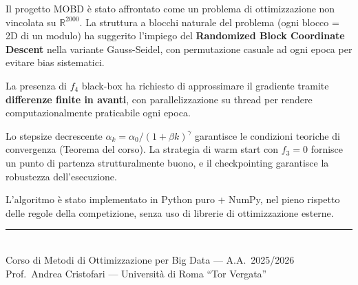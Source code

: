 \documentclass[12pt,a4paper]{article}
\theoremstyle{definition}
\newcommand{\R}{\mathbb{R}}
\begin{document}
Il progetto MOBD è stato affrontato come un problema di ottimizzazione non vincolata su
$\R^{2000}$. La struttura a blocchi naturale del problema (ogni blocco = 2D di un modulo)
ha suggerito l'impiego del \textbf{Randomized Block Coordinate Descent} nella variante
Gauss-Seidel, con permutazione casuale ad ogni epoca per evitare bias sistematici.

La presenza di $f_4$ black-box ha richiesto di approssimare il gradiente tramite
\textbf{differenze finite in avanti}, con parallelizzazione su thread per rendere
computazionalmente praticabile ogni epoca.

Lo stepsize decrescente $\alpha_k = \alpha_0 / (1 + \beta k)^\gamma$ garantisce le condizioni
teoriche di convergenza (Teorema del corso). La strategia di warm start con $f_3 = 0$
fornisce un punto di partenza strutturalmente buono, e il checkpointing garantisce la
robustezza dell'esecuzione.

L'algoritmo è stato implementato in Python puro + NumPy, nel pieno rispetto delle regole
della competizione, senza uso di librerie di ottimizzazione esterne.

\vspace{2cm}
\begin{center}
\rule{0.5\textwidth}{0.4pt}\\[0.3em]
{\small Corso di Metodi di Ottimizzazione per Big Data — A.A.\ 2025/2026\\
Prof.\ Andrea Cristofari — Università di Roma ``Tor Vergata''}
\end{center}
\end{document}
